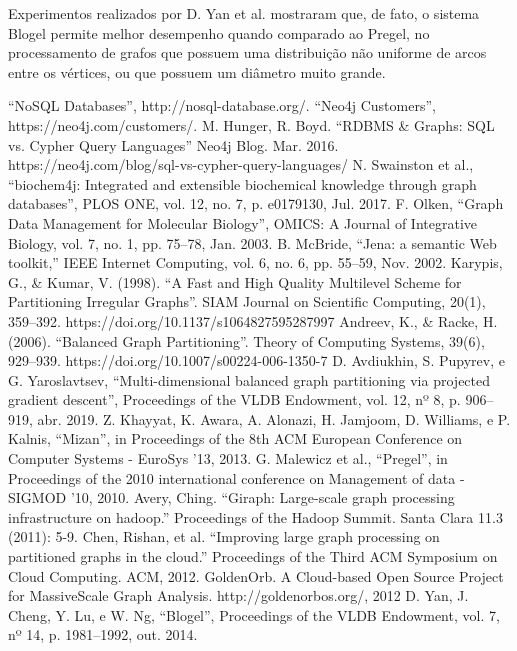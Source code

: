 \documentclass[conference]{IEEEtran}
\begin{document}
Experimentos realizados por D. Yan et al. mostraram que, de fato, o
sistema Blogel permite melhor desempenho quando comparado ao Pregel, no
processamento de grafos que possuem uma distribuição não uniforme de
arcos entre os vértices, ou que possuem um diâmetro muito grande.

\begin{thebibliography}{00}
 ``NoSQL Databases'', http://nosql-database.org/.
 ``Neo4j Customers'',
    https://neo4j.com/customers/.
 M. Hunger, R. Boyd. ``RDBMS \& Graphs: SQL vs.
    Cypher Query Languages'' Neo4j Blog. Mar. 2016.
        https://neo4j.com/blog/sql-vs-cypher-query-languages/
 N. Swainston et al., ``biochem4j: Integrated and
    extensible biochemical knowledge through graph databases'', PLOS
        ONE, vol. 12, no. 7, p. e0179130, Jul. 2017. 
 F. Olken, ``Graph Data Management for Molecular
    Biology'', OMICS: A Journal of Integrative Biology, vol. 7, no. 1,
        pp. 75–78, Jan. 2003.
 B. McBride, ``Jena: a semantic Web toolkit,” IEEE
    Internet Computing, vol. 6, no. 6, pp. 55–59, Nov. 2002.
 Karypis, G., \& Kumar, V. (1998). ``A Fast and High
    Quality Multilevel Scheme for Partitioning Irregular Graphs''. SIAM
        Journal on Scientific Computing, 20(1), 359–392.
        https://doi.org/10.1137/s1064827595287997
 Andreev, K., \& Racke, H. (2006). ``Balanced
    Graph Partitioning''. Theory of Computing Systems, 39(6), 929–939.
        https://doi.org/10.1007/s00224-006-1350-7
 D. Avdiukhin, S. Pupyrev, e G. Yaroslavtsev,
    ``Multi-dimensional balanced graph partitioning via projected
        gradient descent'', Proceedings of the VLDB Endowment, vol. 12,
        nº 8, p. 906–919, abr. 2019.
 Z. Khayyat, K. Awara, A. Alonazi, H. Jamjoom, D.
    Williams, e P. Kalnis, ``Mizan'', in Proceedings of the 8th ACM
        European Conference on Computer Systems - EuroSys ’13, 2013.
 G. Malewicz et al., ``Pregel'', in Proceedings of the
    2010 international conference on Management of data - SIGMOD ’10,
        2010.
 Avery, Ching. ``Giraph: Large-scale graph processing
    infrastructure on hadoop.'' Proceedings of the Hadoop Summit. Santa
        Clara 11.3 (2011): 5-9.
 Chen, Rishan, et al. ``Improving large graph processing
    on partitioned graphs in the cloud.'' Proceedings of the Third ACM
        Symposium on Cloud Computing. ACM, 2012.
 GoldenOrb. A Cloud-based Open Source Project for
    MassiveScale Graph Analysis. http://goldenorbos.org/, 2012
 D. Yan, J. Cheng, Y. Lu, e W. Ng, ``Blogel'',
    Proceedings of the VLDB Endowment, vol. 7, nº 14, p. 1981–1992, out.
        2014.

\end{thebibliography}
\end{document}
